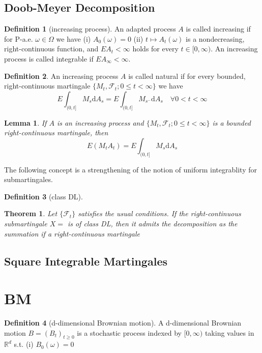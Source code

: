 \documentclass{article}
\newtheorem{Thm}{Theorem}[section]
\newtheorem{Lem}{Lemma}[section]
\theoremstyle{definition}
\newtheorem{Def}{Definition}[section]
\begin{document}
\subsection{Doob-Meyer Decomposition}
\begin{Def}[increasing process]
    An adapted process $A$ is called increasing if for P-a.e. $\omega\in\Omega$ we have \newline 
    (i) $A_0(\omega)=0$\newline 
    (ii) $t\mapsto A_t(\omega)$ is a nondecreasing, right-continuous function, and $EA_t<\infty$ holds for every $t\in [0,\infty)$.\newline 
    An increasing process is called integrable if $EA_\infty<\infty$.
\end{Def}
\begin{Def}
    An increasing process $A$ is called natural if for every bounded, right-continuous martingale $\{M_t,\mathcal{F}_t;0\le t<\infty\}$ we have
    \[ E\int_{(0,t]}M_s\mathrm{d}A_s=E\int_{(0,t]}M_{s^-}\mathrm{d}A_s\quad\forall 0<t<\infty\]
\end{Def}
\begin{Lem}
    If $A$ is an increasing process and $\{M_t,\mathcal{F}_t;0\le t<\infty\}$ is a bounded right-continuous martingale, then 
    \[ E(M_tA_t)=E\int_{(0,t]}M_s\mathrm{d}A_s \]
\end{Lem}
The following concept is a strengthening of the notion of uniform integrablity for submartingales.
\begin{Def}[class DL]
    
\end{Def}
\begin{Thm}
    Let $\{\mathcal{F}_t\}$ satisfies the usual conditions. If the right-continuous submartingale $X=$ is of class DL,
    then it admits the decomposition as the summation if a right-continuous martingale
\end{Thm}

\subsection{Square Integrable Martingales}




\section{BM}
\begin{Def}[d-dimensional Brownian motion]
    A d-dimensional Brownian motion $B=(B_t)_{t\ge 0}$ is a stochastic process indexed by $[0,\infty)$ taking values in $\mathbb{R}^d$ s.t. \newline 
    (i) $B_0(\omega)=0$

\end{Def}
\end{document}
